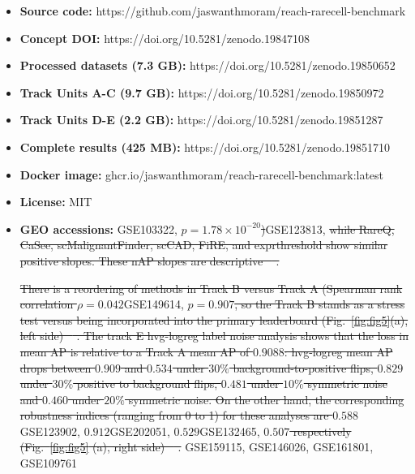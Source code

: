 \documentclass[10pt]{article}
\providecommand{\DIFaddtex}[1]{{\protect\color{trackgreen}#1}} %
\providecommand{\DIFdeltex}[1]{{\protect\color{red}\sout{#1}}}                      %
\providecommand{\DIFaddbegin}{} %
\providecommand{\DIFaddend}{} %
\providecommand{\DIFdelbegin}{} %
\providecommand{\DIFdelend}{} %
\providecommand{\DIFadd}[1]{\texorpdfstring{\DIFaddtex{#1}}{#1}} %
\providecommand{\DIFdel}[1]{\texorpdfstring{\DIFdeltex{#1}}{}} %
\newcommand{\DIFscaledelfig}{0.5}
\newlength{\DIFdelgraphicswidth} %
\newlength{\DIFdelgraphicsheight} %
\newcommand{\DIFaddincludegraphics}[2][]{{\color{trackgreen}\fbox{\DIFOincludegraphics[#1]{#2}}}} %
\newcommand{\DIFdelincludegraphics}[2][]{%
\sbox{\DIFdelgraphicsbox}{\DIFOincludegraphics[#1]{#2}}%
\settoboxwidth{\DIFdelgraphicswidth}{\DIFdelgraphicsbox} %
\settoboxtotalheight{\DIFdelgraphicsheight}{\DIFdelgraphicsbox} %
\scalebox{\DIFscaledelfig}{%
\parbox[b]{\DIFdelgraphicswidth}{\usebox{\DIFdelgraphicsbox}\\[-\baselineskip] \rule{\DIFdelgraphicswidth}{0em}}\llap{\resizebox{\DIFdelgraphicswidth}{\DIFdelgraphicsheight}{%
\setlength{\unitlength}{\DIFdelgraphicswidth}%
\begin{picture}(1,1)%
\thicklines\linethickness{2pt} %
{\color[rgb]{1,0,0}\put(0,0){\framebox(1,1){}}}%
{\color[rgb]{1,0,0}\put(0,0){\line( 1,1){1}}}%
{\color[rgb]{1,0,0}\put(0,1){\line(1,-1){1}}}%
\end{picture}%
}\hspace*{3pt}}} %
} %
\DeclareRobustCommand{\DIFaddbegin}{\DIFOaddbegin \let\includegraphics\DIFaddincludegraphics} %
\DeclareRobustCommand{\DIFaddend}{\DIFOaddend \let\includegraphics\DIFOincludegraphics} %
\DeclareRobustCommand{\DIFdelbegin}{\DIFOdelbegin \let\includegraphics\DIFdelincludegraphics} %
\DeclareRobustCommand{\DIFdelend}{\DIFOaddend \let\includegraphics\DIFOincludegraphics} %
\providecommand{\tightlist}{\setlength{\itemsep}{0pt}\setlength{\parskip}{0pt}}
\begin{document}
\begin{itemize}
\tightlist
\item
  \textbf{\DIFadd{Source code:}}
  \DIFadd{https://github.com/jaswanthmoram/reach-rarecell-benchmark
}\item
  \textbf{\DIFadd{Concept DOI:}} \DIFadd{https://doi.org/10.5281/zenodo.19847108
}\item
  \textbf{\DIFadd{Processed datasets (7.3 GB):}}
  \DIFadd{https://doi.org/10.5281/zenodo.19850652
}\item
  \textbf{\DIFadd{Track Units A-C (9.7 GB):}}
  \DIFadd{https://doi.org/10.5281/zenodo.19850972
}\item
  \textbf{\DIFadd{Track Units D-E (2.2 GB):}}
  \DIFadd{https://doi.org/10.5281/zenodo.19851287
}\item
  \textbf{\DIFadd{Complete results (425 MB):}}
  \DIFadd{https://doi.org/10.5281/zenodo.19851710
}\item
  \textbf{\DIFadd{Docker image:}}
  \DIFadd{ghcr.io/jaswanthmoram/reach-rarecell-benchmark:latest
}\item
  \textbf{\DIFadd{License:}} \DIFadd{MIT
}\item
  \textbf{\DIFadd{GEO accessions:}} \DIFadd{GSE103322}\DIFaddend , \DIFdelbegin \DIFdel{$p = 1.78 \times 10^{-20}$)}\DIFdelend \DIFaddbegin \DIFadd{GSE123813}\DIFaddend , \DIFdelbegin \DIFdel{while RareQ, CaSee, scMalignantFinder, scCAD, FiRE, and exprthreshold show similar positive slopes. These nAP slopes are descriptive \mbox{%
\cite{johnson2019survey,altalhan2025imbalanced}}\hskip0pt%
.
}%

\DIFdel{There is a reordering of methods in Track B versus Track A (Spearman rank correlation $\rho = 0.042$}\DIFdelend \DIFaddbegin \DIFadd{GSE149614}\DIFaddend , \DIFdelbegin \DIFdel{$p = 0.907$, so the Track B stands as a stress test versus being incorporated into the primary leaderboard (Fig.~\ref{fig:fig5}(a), left side) \mbox{%
\cite{cao2021benchmark}}\hskip0pt%
. The track E hvg-logreg label noise analysis shows that the loss in mean AP is relative to a Track A mean AP of $0.9088$: hvg-logreg mean AP drops between $0.909$ and $0.534$ under $30\% $ background-to-positive flips, $0.829$ under $30\%$ positive to background flips, $0.481$ under $10\%$ symmetric noise and $0.460$ under $20\%$ symmetric noise.
  On the other hand, the corresponding robustness indices (ranging from 0 to 1) for these analyses are $0.588$}\DIFdelend \DIFaddbegin \DIFadd{GSE123902}\DIFaddend ,
  \DIFdelbegin \DIFdel{$0.912$}\DIFdelend \DIFaddbegin \DIFadd{GSE202051}\DIFaddend , \DIFdelbegin \DIFdel{$0.529$}\DIFdelend \DIFaddbegin \DIFadd{GSE132465}\DIFaddend , \DIFdelbegin \DIFdel{$0.507$ respectively (Fig.~\ref{fig:fig5} (a), right side) \mbox{%
\cite{mahalanabis2022evaluation}}\hskip0pt%
.
}\DIFdelend \DIFaddbegin \DIFadd{GSE159115, GSE146026, GSE161801, GSE109761
}\end{itemize}
\DIFaddend 
\end{document}
